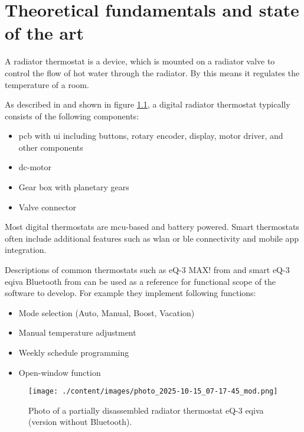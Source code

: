 %
%

\chapter{Theoretical fundamentals and state of the art}
\label{chap:Theoretical fundamentals and state of the art}
%
A radiator thermostat is a device, which is mounted on a radiator valve to control the flow of hot water through the radiator. By this means it regulates the temperature of a room.

As described in \cite{ELVjournal.2012} and shown in figure \ref{fig:rt-photo}, a digital radiator thermostat typically consists of the following components:

\begin{itemize}
	\item \acs{pcb} with \ac{ui} including buttons, rotary encoder, display, motor driver, and other components
	\item \ac{dc}-motor
	\item Gear box with planetary gears
	\item Valve connector
\end{itemize}

Most digital thermostats are \ac{mcu}-based and battery powered. Smart thermostats often include additional features such as \ac{wlan} or \ac{ble} connectivity and mobile app integration. 

Descriptions of common thermostats such as eQ-3 MAX! from \cite{ELVjournal.2012} and smart eQ-3 eqiva Bluetooth from \cite{eQ3AG.05.2018} can be used as a reference for functional scope of the software to develop. For example they implement following functions:

\begin{itemize}
	\item Mode selection (Auto, Manual, Boost, Vacation)
	\item Manual temperature adjustment
	\item Weekly schedule programming
	\item Open-window function
\end{itemize}

\begin{figure}[htbp]
	\centering
	\texttt{[image: ./content/images/photo\_2025-10-15\_07-17-45\_mod.png]}
	\caption{Photo of a partially disassembled radiator thermostat eQ-3 eqiva (version without Bluetooth).}
	\label{fig:rt-photo}
\end{figure}